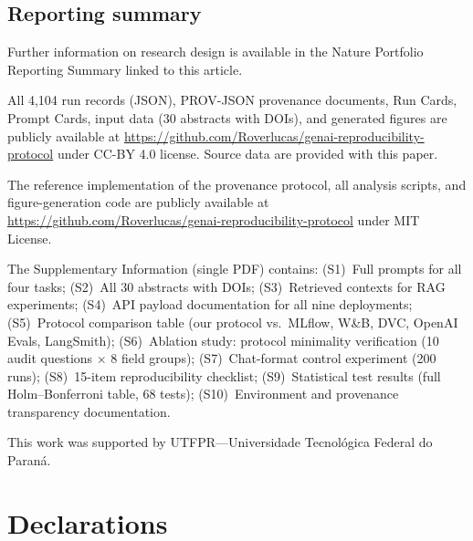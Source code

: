 \documentclass[sn-nature]{sn-jnl}
\begin{document}
\subsection{Reporting summary}\label{subsec:reporting}

Further information on research design is available in the Nature Portfolio Reporting Summary linked to this article.


\backmatter


All 4,104 run records (JSON), PROV-JSON provenance documents, Run Cards, Prompt Cards, input data (30 abstracts with DOIs), and generated figures are publicly available at \url{https://github.com/Roverlucas/genai-reproducibility-protocol} under CC-BY 4.0 license.
Source data are provided with this paper.


The reference implementation of the provenance protocol, all analysis scripts, and figure-generation code are publicly available at \url{https://github.com/Roverlucas/genai-reproducibility-protocol} under MIT License.


The Supplementary Information (single PDF) contains:
(S1)~Full prompts for all four tasks;
(S2)~All 30 abstracts with DOIs;
(S3)~Retrieved contexts for RAG experiments;
(S4)~API payload documentation for all nine deployments;
(S5)~Protocol comparison table (our protocol vs.\ MLflow, W\&B, DVC, OpenAI Evals, LangSmith);
(S6)~Ablation study: protocol minimality verification (10 audit questions $\times$ 8 field groups);
(S7)~Chat-format control experiment (200 runs);
(S8)~15-item reproducibility checklist;
(S9)~Statistical test results (full Holm--Bonferroni table, 68 tests);
(S10)~Environment and provenance transparency documentation.


This work was supported by UTFPR---Universidade Tecnol\'ogica Federal do Paran\'a.

\section*{Declarations}
\end{document}
